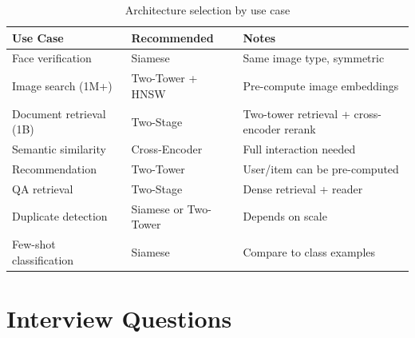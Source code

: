 \begin{table}[H]
\centering
\caption{Architecture selection by use case}
\begin{tabularx}{\textwidth}{lXX}
\toprule
\textbf{Use Case} & \textbf{Recommended} & \textbf{Notes} \\
\midrule
Face verification & Siamese & Same image type, symmetric \\
Image search (1M+) & Two-Tower + HNSW & Pre-compute image embeddings \\
Document retrieval (1B) & Two-Stage & Two-tower retrieval + cross-encoder rerank \\
Semantic similarity & Cross-Encoder & Full interaction needed \\
Recommendation & Two-Tower & User/item can be pre-computed \\
QA retrieval & Two-Stage & Dense retrieval + reader \\
Duplicate detection & Siamese or Two-Tower & Depends on scale \\
Few-shot classification & Siamese & Compare to class examples \\
\bottomrule
\end{tabularx}
\end{table}

\section{Interview Questions}
\label{sec:similarity_questions}


